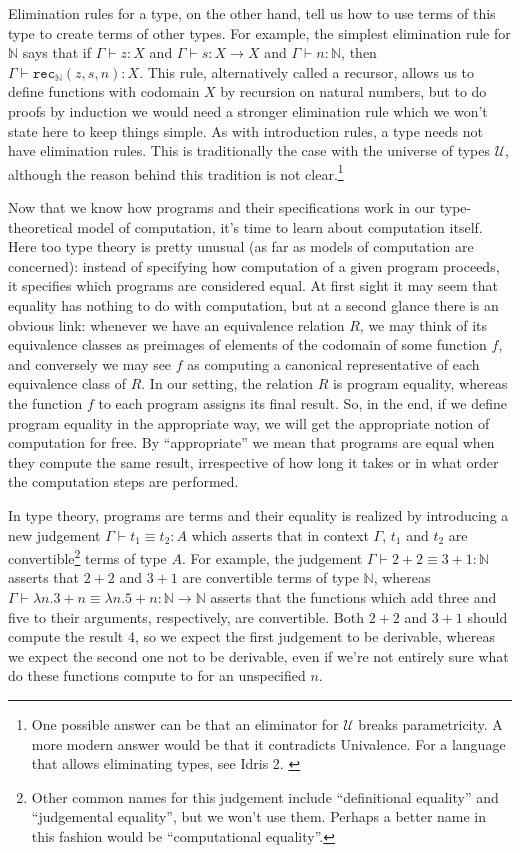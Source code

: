 \documentclass[declaration,mgr,english,shortabstract]{iithesis}
\newcommand{\m}[1]{\texttt{#1}}
\newcommand{\term}[3]{#1 \vdash #2 : #3}
\newcommand{\termconv}[4]{#1 \vdash #2 \equiv #3 : #4}
\newcommand{\N}{\mathbb{N}}
\newcommand{\recN}[3]{\m{rec}_\N(#1, #2, #3)}
\begin{document}
Elimination rules for a type, on the other hand, tell us how to use terms of this type to create terms of other types. For example, the simplest elimination rule for $\N$ says that if $\term{\Gamma}{z}{X}$ and $\term{\Gamma}{s}{X \to X}$ and $\term{\Gamma}{n}{\N}$, then $\term{\Gamma}{\recN{z}{s}{n}}{X}$. This rule, alternatively called a recursor, allows us to define functions with codomain $X$ by recursion on natural numbers, but to do proofs by induction we would need a stronger elimination rule which we won't state here to keep things simple. As with introduction rules, a type needs not have elimination rules. This is traditionally the case with the universe of types $\mathcal{U}$, although the reason behind this tradition is not clear.\footnote{One possible answer can be that an eliminator for $\mathcal{U}$ breaks parametricity. A more modern answer \cite{HoTTBlog} would be that it contradicts Univalence. For a language that allows eliminating types, see Idris 2. \cite{Idris2}}

\label{convertible}

Now that we know how programs and their specifications work in our type-theoretical model of computation, it's time to learn about computation itself. Here too type theory is pretty unusual (as far as models of computation are concerned): instead of specifying how computation of a given program proceeds, it specifies which programs are considered equal. At first sight it may seem that equality has nothing to do with computation, but at a second glance there is an obvious link: whenever we have an equivalence relation $R$, we may think of its equivalence classes as preimages of elements of the codomain of some function $f$, and conversely we may see $f$ as computing a canonical representative of each equivalence class of $R$. In our setting, the relation $R$ is program equality, whereas the function $f$ to each program assigns its final result. So, in the end, if we define program equality in the appropriate way, we will get the appropriate notion of computation for free. By ``appropriate'' we mean that programs are equal when they compute the same result, irrespective of how long it takes or in what order the computation steps are performed.

In type theory, programs are terms and their equality is realized by introducing a new judgement $\termconv{\Gamma}{t_1}{t_2}{A}$ which asserts that in context $\Gamma$, $t_1$ and $t_2$ are convertible\footnote{Other common names for this judgement include ``definitional equality'' and ``judgemental equality'', but we won't use them. Perhaps a better name in this fashion would be ``computational equality''.} terms of type $A$. For example, the judgement $\termconv{\Gamma}{2 + 2}{3 + 1}{\N}$ asserts that $2 + 2$ and $3 + 1$ are convertible terms of type $\N$, whereas $\termconv{\Gamma}{\lambda n. 3 + n}{\lambda n. 5 + n}{\N \to \N}$ asserts that the functions which add three and five to their arguments, respectively, are convertible. Both $2 + 2$ and $3 + 1$ should compute the result $4$, so we expect the first judgement to be derivable, whereas we expect the second one not to be derivable, even if we're not entirely sure what do these functions compute to for an unspecified $n$.
\end{document}
